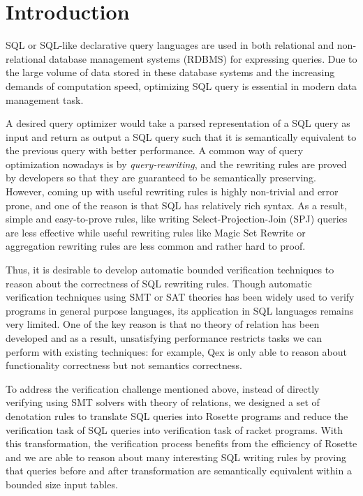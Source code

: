 \section{Introduction}

SQL or SQL-like declarative query languages are used in both relational and non-relational database management systems (RDBMS) for expressing queries. Due to the large volume of data stored in these database systems and the increasing demands of computation speed, optimizing SQL query is essential in modern data management task. 

A desired query optimizer would take a parsed representation of a SQL query as input and return as output a SQL query such that it is semantically equivalent to the previous query with better performance. A common way of query optimization nowadays is by \emph{query-rewriting}, and the rewriting rules are proved by developers so that they are guaranteed to be semantically preserving. However, coming up with useful rewriting rules is highly non-trivial and error prone, and one of the reason is that SQL has relatively rich syntax. As a result, simple and easy-to-prove rules, like writing Select-Projection-Join (SPJ) queries are less effective while useful rewriting rules like Magic Set Rewrite or aggregation rewriting rules are less common and rather hard to proof.

Thus, it is desirable to develop automatic bounded verification techniques to reason about the correctness of SQL rewriting rules. Though automatic verification techniques using SMT or SAT theories has been widely used to verify programs in general purpose languages, its application in SQL languages remains very limited. One of the key reason is that no theory of relation has been developed and as a result, unsatisfying performance restricts tasks we can perform with existing techniques: for example, Qex is only able to reason about functionality correctness but not semantics correctness.

To address the verification challenge mentioned above, instead of directly verifying using SMT solvers with theory of relations, we designed a set of denotation rules to translate SQL queries into Rosette programs and reduce the verification task of SQL queries into verification task of racket programs. With this transformation, the verification process benefits from the efficiency of Rosette and we are able to reason about many interesting SQL writing rules by proving that queries before and after transformation are semantically equivalent within a bounded size input tables.